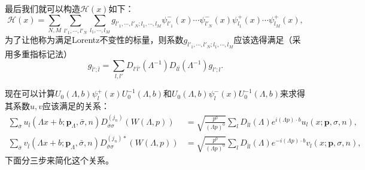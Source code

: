 \documentclass[9pt]{extbook}
\theoremstyle{plain}%
\begin{document}
最后我们就可以构造$\mathscr{H}(x)$如下：
\[
\mathscr{H}(x)=\sum_{N,M}\sum_{l'_1,\cdots,l'_N}
\sum_{l_1,\cdots,l_M}g_{l'_1,\cdots,l'_N;l_1,\cdots,l_M}\psi_{l'_1}^{-}(x)\cdots \psi_{l'_N}^{-}(x)\psi_{l_1}^{+}(x)\cdots \psi_{l_M}^{+}(x),
\]
为了让他称为满足Lorentz不变性的标量，则系数$g_{l'_1,\cdots,l'_N;l_1,\cdots,l_M}$应该选得满足（采用多重指标记法）
\[
	g_{\bar{l}';\bar{l}}=\sum_{l,l'}D_{l'\bar{l}'}(\Lambda^{-1})D_{l\bar{l}}(\Lambda^{-1})g_{l';l}.
\]

现在可以计算$U_0(\Lambda,b)\psi_l^{+}(x)U_0^{-1}(\Lambda,b)$和$U_0(\Lambda,b)\psi_l^{-}(x)U_0^{-1}(\Lambda,b)$来求得其系数$u,v$应该满足的关系：
\begin{equation}
	\begin{split}
		\sum_{\bar{\sigma}}u_{\bar{l}}(\Lambda x+b;\mathbf{p}_\Lambda,\bar{\sigma},n)D^{(j_n)}_{\bar{\sigma}\sigma}\left(W(\Lambda,p)\right)&=\sqrt{\frac{p^0}{(\Lambda p)^0}}\sum_{l} D_{\bar{l}l}(\Lambda)e^{i(\Lambda p)\cdot b}u_{l}(x;\mathbf{p},\sigma,n),\\
		\sum_{\bar{\sigma}}v_{\bar{l}}(\Lambda x+b;\mathbf{p}_\Lambda,\bar{\sigma},n)D^{(j_n)*}_{\bar{\sigma}\sigma}\left(W(\Lambda,p)\right)&=\sqrt{\frac{p^0}{(\Lambda p)^0}}\sum_{l} D_{\bar{l}l}(\Lambda)e^{-i(\Lambda p)\cdot b}v_{l}(x;\mathbf{p},\sigma,n),
	\end{split}
\label{xishu}
\end{equation}
下面分三步来简化这个关系。
\end{document}

